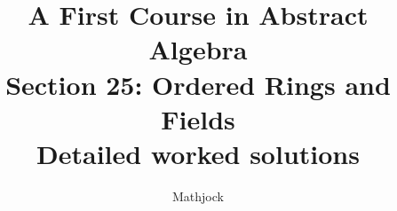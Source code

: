 
\title{\textbf{A First Course in Abstract Algebra}\\[0.3em]Section 25: Ordered Rings and Fields\\[0.3em]\large Detailed worked solutions}
\author{Mathjock}
\date{}

\maketitle
\bookinfo
\tableofcontents
\clearpage
\renewcommand{\thesection}{25}
\renewcommand{\theHsection}{fraleigh.25}


